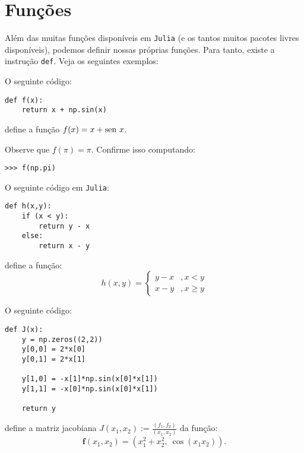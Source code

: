 \section{Funções}

Além das muitas funções disponíveis em \verb+Julia+ (e os tantos muitos pacotes livres disponíveis), podemos definir nossas próprias funções. Para tanto, existe a instrução \verb+def+. Veja os seguintes exemplos:

\begin{ex}
  O seguinte código:
\begin{lstlisting}
def f(x):
    return x + np.sin(x)
\end{lstlisting}
define a função $f(x) = x + \operatorname{sen}\, x$.

Observe que $f(\pi) = \pi$. Confirme isso computando:
\begin{lstlisting}
>>> f(np.pi)
\end{lstlisting}
\end{ex}

\begin{ex}
  O seguinte código em \verb+Julia+:
\begin{lstlisting}
def h(x,y):
    if (x < y):
        return y - x
    else:
        return x - y
\end{lstlisting}
define a função:
\begin{equation}
  h(x,y) = \left\{
    \begin{array}{ll}
      y - x &, x < y\\
      x - y &, x \geq y
    \end{array}
\right.
\end{equation}
\end{ex}

\begin{ex}
  O seguinte código:
\begin{lstlisting}
def J(x):
    y = np.zeros((2,2))
    y[0,0] = 2*x[0]
    y[0,1] = 2*x[1]

    y[1,0] = -x[1]*np.sin(x[0]*x[1])
    y[1,1] = -x[0]*np.sin(x[0]*x[1])

    return y
\end{lstlisting}
define a matriz jacobiana $J(x_1,x_2) := \frac{(f_1,f_2)}{(x_1,x_2)}$ da função:
\begin{equation}
  \pmb{f}(x_1,x_2) = (x_1^2 + x_2^2,~\cos(x_1x_2)).
\end{equation}
\end{ex}





















